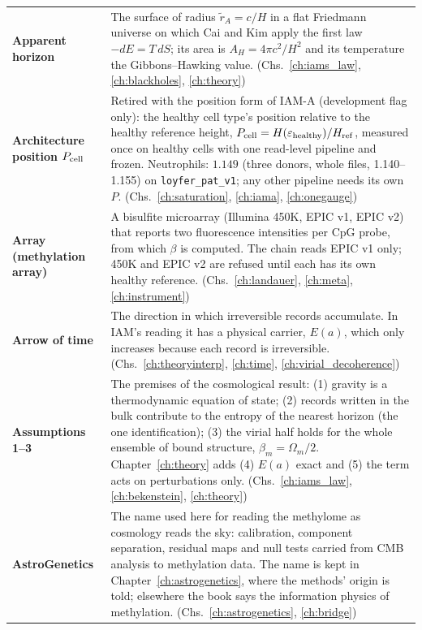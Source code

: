 {\begin{longtable}{@{}>{\raggedright\arraybackslash}p{}>{\raggedright\arraybackslash}p{}@{}}
\iamrowrule
\textbf{Apparent horizon} & The surface of radius $\tilde r_A=c/H$ in a flat Friedmann universe on which Cai and Kim apply the first law $-dE=T\,dS$; its area is $A_H=4\pi c^2/H^2$ and its temperature the Gibbons--Hawking value. {\footnotesize(Chs.~\ref{ch:iams_law}, \ref{ch:blackholes}, \ref{ch:theory})}\\[1pt]
\iamrowrule
\textbf{Architecture position $P_{\rm cell}$} & Retired with the position form of IAM-A (development flag only): the healthy cell type's position relative to the healthy reference height, $P_{\rm cell}=H(\varepsilon_{\rm healthy})/H_{\rm ref}$, measured once on healthy cells with one read-level pipeline and frozen. Neutrophils: $1.149$ (three donors, whole files, 1.140--1.155) on \texttt{loyfer\_pat\_v1}; any other pipeline needs its own $P$. {\footnotesize(Chs.~\ref{ch:saturation}, \ref{ch:iama}, \ref{ch:onegauge})}\\[1pt]
\iamrowrule
\textbf{Array (methylation array)} & A bisulfite microarray (Illumina 450K, EPIC v1, EPIC v2) that reports two fluorescence intensities per CpG probe, from which $\beta$ is computed. The chain reads EPIC v1 only; 450K and EPIC v2 are refused until each has its own healthy reference. {\footnotesize(Chs.~\ref{ch:landauer}, \ref{ch:meta}, \ref{ch:instrument})}\\[1pt]
\iamrowrule
\textbf{Arrow of time} & The direction in which irreversible records accumulate. In IAM's reading it has a physical carrier, $E(a)$, which only increases because each record is irreversible. {\footnotesize(Chs.~\ref{ch:theoryinterp}, \ref{ch:time}, \ref{ch:virial_decoherence})}\\[1pt]
\iamrowrule
\textbf{Assumptions 1--3} & The premises of the cosmological result: (1) gravity is a thermodynamic equation of state; (2) records written in the bulk contribute to the entropy of the nearest horizon (the one identification); (3) the virial half holds for the whole ensemble of bound structure, $\beta_m=\Omega_m/2$. Chapter~\ref{ch:theory} adds (4) $E(a)$ exact and (5) the term acts on perturbations only. {\footnotesize(Chs.~\ref{ch:iams_law}, \ref{ch:bekenstein}, \ref{ch:theory})}\\[1pt]
\iamrowrule
\textbf{AstroGenetics} & The name used here for reading the methylome as cosmology reads the sky: calibration, component separation, residual maps and null tests carried from CMB analysis to methylation data. The name is kept in Chapter~\ref{ch:astrogenetics}, where the methods' origin is told; elsewhere the book says the information physics of methylation. {\footnotesize(Chs.~\ref{ch:astrogenetics}, \ref{ch:bridge})}\\[1pt]

\end{longtable}}

